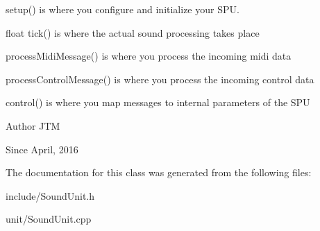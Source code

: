 \begin{DoxyItemize}
\item setup() is where you configure and initialize your S\+PU.
\item float tick() is where the actual sound processing takes place
\item process\+Midi\+Message() is where you process the incoming midi data
\item process\+Control\+Message() is where you process the incoming control data
\item control() is where you map messages to internal parameters of the S\+PU
\end{DoxyItemize}

\begin{DoxyAuthor}{Author}
J\+TM 
\end{DoxyAuthor}
\begin{DoxySince}{Since}
April, 2016 
\end{DoxySince}


The documentation for this class was generated from the following files\+:\begin{DoxyCompactItemize}
\item 
include/Sound\+Unit.\+h\item 
unit/Sound\+Unit.\+cpp\end{DoxyCompactItemize}
